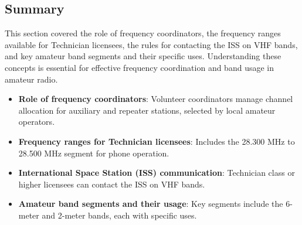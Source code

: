 
\subsection*{Summary}
This section covered the role of frequency coordinators, the frequency ranges available for Technician licensees, the rules for contacting the ISS on VHF bands, and key amateur band segments and their specific uses. Understanding these concepts is essential for effective frequency coordination and band usage in amateur radio.

\begin{itemize}
    \item \textbf{Role of frequency coordinators}: Volunteer coordinators manage channel allocation for auxiliary and repeater stations, selected by local amateur operators.
    \item \textbf{Frequency ranges for Technician licensees}: Includes the 28.300 MHz to 28.500 MHz segment for phone operation.
    \item \textbf{International Space Station (ISS) communication}: Technician class or higher licensees can contact the ISS on VHF bands.
    \item \textbf{Amateur band segments and their usage}: Key segments include the 6-meter and 2-meter bands, each with specific uses.
\end{itemize}
